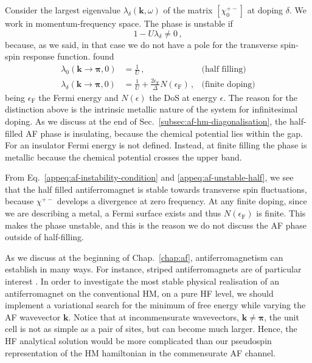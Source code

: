 Consider the largest eigenvalue $\lambda_\delta(\mathbf{k},\omega)$ of the matrix $[\chi_0^{+-}]$ at doping $\delta$. We work in momentum-frequency space. The phase is unstable if
\begin{equation}\label{appeq:af-instability-condition}
	1 - U \lambda_\delta \neq 0 \, ,
\end{equation}
because, as we said, in that case we do not have a pole for the transverse spin-spin response function. \citeauthor{singh1990collective} \cite{singh1990collective} found 
\begin{align}
	\lambda_0(\mathbf{k}\to\bm{\pi},0) &= \frac 1 U \, , &\text{(half filling)} \label{appeq:af-unstable-half} \\
	\lambda_\delta(\mathbf{k}\to\bm{\pi},0) &= \frac 1 U + \frac{2\epsilon_\mathrm{F}}{\Delta} N(\epsilon_\mathrm{F}) \, , &\text{(finite doping)} \label{appeq:af-unstable}
\end{align}
being $\epsilon_\mathrm{F}$ the Fermi energy and $N(\epsilon)$ the DoS at energy $\epsilon$. The reason for the distinction above is the intrinsic metallic nature of the system for infinitesimal doping. As we discuss at the end of Sec.~\ref{subsec:af-hm-diagonalisation}, the half-filled AF phase is insulating, because the chemical potential lies within the gap. For an insulator Fermi energy is not defined. Instead, at finite filling the phase is metallic because the chemical potential crosses the upper band.

From Eq.~\eqref{appeq:af-instability-condition} and \eqref{appeq:af-unstable-half}, we see that the half filled antiferromagnet is stable towards transverse spin fluctuations, because $\chi^{+-}$ develops a divergence at zero frequency. At any finite doping, since we are describing a metal, a Fermi surface exists and thus $N(\epsilon_\mathrm{F})$ is finite. This makes the phase unstable, and this is the reason we do not discuss the AF phase outside of half-filling.

As we discuss at the beginning of Chap.~\ref{chap:af}, antiferromagnetism can establish in many ways. For instance, striped antiferromagnets are of particular interest \cite{wietek2021stripes}. In order to investigate the most stable physical realisation of an antiferromagnet on the conventional HM, on a pure HF level, we should implement a variational search for the minimum of free energy while varying the AF wavevector $\mathbf{k}$. Notice that at incommensurate wavevectors, $\mathbf{k} \neq \bm{\pi}$, the unit cell is not as simple as a pair of sites, but can become much larger. Hence, the HF analytical solution would be more complicated than our pseudospin representation of the HM hamiltonian in the commensurate AF channel.

